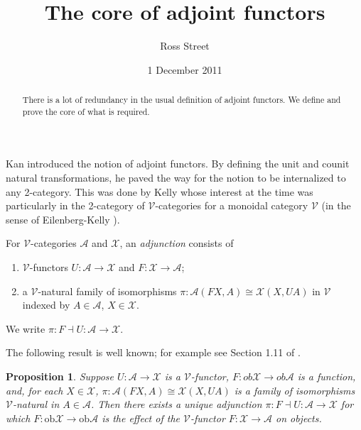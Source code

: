 \documentclass{amsart}
\newtheorem{proposition}[theorem]{Proposition}
\theoremstyle{definition}
\theoremstyle{remark}
\numberwithin{equation}{section}
\begin{document}
\title{ The core of adjoint functors}
\author{Ross Street}
\address{Centre of Australian Category Theory, Department of Mathematics,
Macquarie University, NSW 2109, Australia}
\label{I1}
\date{1 December 2011}
\begin{abstract}
There is a lot of redundancy in the usual definition of adjoint
functors. We define and prove the core of what is required.\ \ \ 
\end{abstract}
\maketitle

Kan \cite{KanAdjFun} introduced the notion of adjoint functors.
By defining the unit and counit natural transformations, he paved
the way for the notion to be internalized to any 2-category. This
was done by Kelly \cite{Kelly1969} whose interest at the time was
particularly in the 2-category of $\mathcal{V}$-categories for a
monoidal category $\mathcal{V}$ (in the sense of Eilenberg-Kelly
\cite{EilKel1966}). 


For $\mathcal{V}$-categories $\mathcal{A}$ and $\mathcal{X}$, an
{\itshape adjunction} consists of
\begin{enumerate}
\item  $\mathcal{V}$-functors $U:\mathcal{A}\longrightarrow \mathcal{X}$
and $F:\mathcal{X}\longrightarrow \mathcal{A}$;
\item a $\mathcal{V}$-natural family of isomorphisms $\pi :\mathcal{A}(
F X,A) \cong \mathcal{X}( X,U A) $ in $\mathcal{V}$ indexed by $A\in
\mathcal{A}$, $X\in \mathcal{X}$.
\end{enumerate}
We write $\pi :F\dashv U:\mathcal{A}\longrightarrow \mathcal{X}$.


The following result is well known; for example see Section 1.11
of \cite{KellyBook}.
\begin{proposition}

Suppose $U:\mathcal{A}\longrightarrow \mathcal{X}$ is a $\mathcal{V}$-functor,
$F:\mathit{ob}\mathcal{X}\longrightarrow \mathit{ob}\mathcal{A}$
is a function, and, for each $X\in \mathcal{X}$, $\pi :\mathcal{A}(
F X,A) \cong \mathcal{X}( X,U A) $ is a family of isomorphisms $\mathcal{V}$-natural
in $A\in \mathcal{A}$. Then there exists a unique adjunction $\pi
:F\dashv U:\mathcal{A}\longrightarrow \mathcal{X}$ for which $F:\mathrm{ob\mathcal{X}}\longrightarrow
\mathrm{ob\mathcal{A}}$ is the effect of the $\mathcal{V}$-functor
$F:\mathcal{X}\longrightarrow \mathcal{A}$ on objects.\ \ \ \ \ \ \label{XRef-Proposition-121173012}
\end{proposition}
\end{document}
